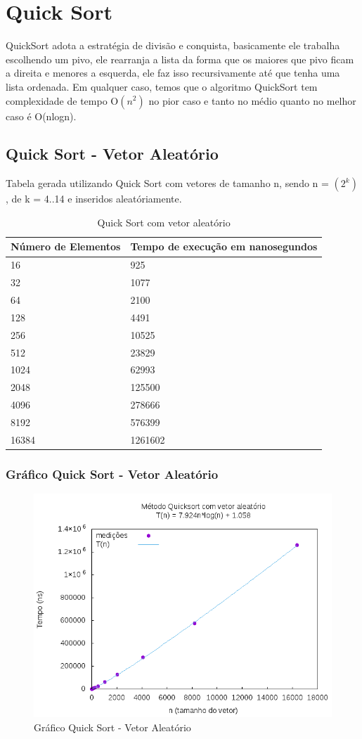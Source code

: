 \documentclass[12pt,a4paper,twoside]{report}
\begin{document}
\chapter{Quick Sort}
QuickSort adota a estratégia de divisão e conquista, basicamente ele trabalha escolhendo um pivo, ele rearranja a lista da forma que os maiores que pivo ficam a direita e menores a esquerda, ele faz isso recursivamente até que tenha uma lista ordenada.
Em qualquer caso, temos que o algoritmo QuickSort tem complexidade de tempo O$(n^2)$ no pior caso e tanto no médio quanto no melhor caso é O(nlogn).

\section{Quick Sort - Vetor Aleatório}
Tabela gerada utilizando Quick Sort com vetores de tamanho n, sendo n = $(2^k)$, de k = 4..14 e inseridos aleatóriamente.
\begin{table}[H]
\centering
\caption{Quick Sort com vetor aleatório}
\label{my-label}
\begin{tabular}{|l|l|}
\hline
\multicolumn{1}{|c|}{\textbf{Número de Elementos}} & \multicolumn{1}{c|}{\textbf{Tempo de execução em nanosegundos}} \\ \hline
16 & 925 \\ \hline
32 & 1077 \\ \hline
64 & 2100 \\ \hline
128 & 4491 \\ \hline
256 & 10525 \\ \hline
512 & 23829 \\ \hline
1024 & 62993 \\ \hline
2048 & 125500 \\ \hline
4096 & 278666 \\ \hline
8192 & 576399 \\ \hline
16384 & 1261602 \\ \hline
\end{tabular}
\end{table}

\subsection{Gráfico Quick Sort - Vetor Aleatório}
\begin{figure}[H]
    \centering
    \includegraphics[width=0.7\linewidth]{graficos/QuickSort/vIntAleatorio/vIntAleatorio.png}
  \caption{Gráfico Quick Sort - Vetor Aleatório}
\end{figure}
\end{document}
